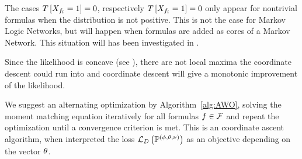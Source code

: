 %
The cases $T\left[X_{f_{l}}=1\right]=0$, respectively $T\left[X_{f_{l}}=1\right]=0$ only appear for nontrivial formulas when the distribution is not positive. 
This is not the case for Markov Logic Networks, but will happen when formulas are added as cores of a Markov Network.
This situation will has been investigated in .


Since the likelihood is concave (see \cite{koller_probabilistic_2009}), there are not local maxima the coordinate descent could run into and coordinate descent will give a monotonic improvement of the likelihood. 

We suggest an alternating optimization by Algorithm~\ref{alg:AWO}, solving the moment matching equation iteratively for all formulas $f\in\mathcal{F}$ and repeat the optimization until a convergence criterion is met.
This is an coordinate ascent algorithm, when interpreted the loss $\mathcal{L}_{D}\left(\mathbb{P}^{(\phi,\theta,\nu)}\right)$ as an objective depending on the vector $\theta$.

